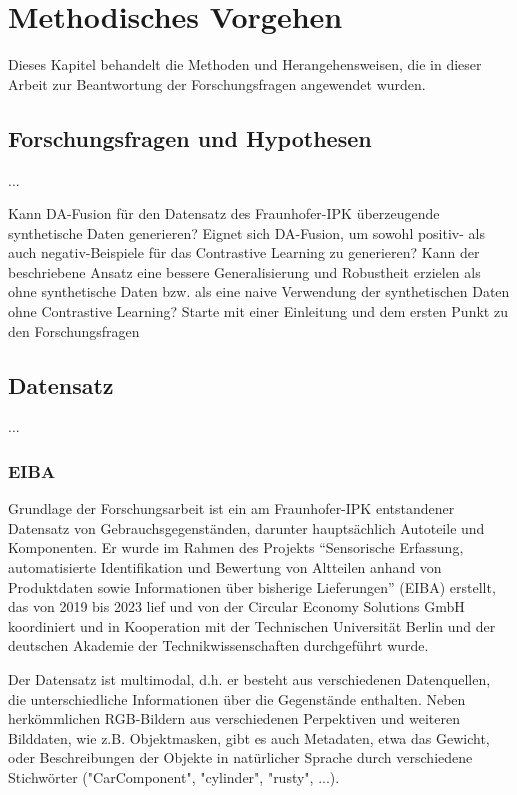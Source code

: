 \chapter{Methodisches Vorgehen}

Dieses Kapitel behandelt die Methoden und Herangehensweisen, die in dieser Arbeit zur Beantwortung der Forschungsfragen angewendet wurden.

\section{Forschungsfragen und Hypothesen}

...

\textbullet Kann DA-Fusion für den Datensatz des Fraunhofer-IPK überzeugende synthetische Daten generieren?
\textbullet Eignet sich DA-Fusion, um sowohl positiv- als auch negativ-Beispiele für das Contrastive Learning zu generieren?
\textbullet Kann der beschriebene Ansatz eine bessere Generalisierung und Robustheit erzielen als ohne synthetische Daten bzw. als eine naive Verwendung der synthetischen Daten ohne Contrastive Learning?
Starte mit einer Einleitung und dem ersten Punkt zu den Forschungsfragen

\section{Datensatz}

...

\subsection{EIBA}

Grundlage der Forschungsarbeit ist ein am Fraunhofer-IPK entstandener Datensatz von Gebrauchsgegenständen, darunter hauptsächlich Autoteile und Komponenten. Er wurde im Rahmen des Projekts “Sensorische Erfassung, automatisierte Identifikation und Bewertung von Altteilen anhand von Produktdaten sowie Informationen über bisherige Lieferungen” (EIBA) erstellt, das von 2019 bis 2023 lief und von der Circular Economy Solutions GmbH koordiniert und in Kooperation mit der Technischen Universität Berlin und der deutschen Akademie der Technikwissenschaften durchgeführt wurde.

Der Datensatz ist multimodal, d.h. er besteht aus verschiedenen Datenquellen, die unterschiedliche Informationen über die Gegenstände enthalten. Neben herkömmlichen RGB-Bildern aus verschiedenen Perpektiven und weiteren Bilddaten, wie z.B. Objektmasken, gibt es auch Metadaten, etwa das Gewicht, oder Beschreibungen der Objekte in natürlicher Sprache durch verschiedene Stichwörter ("CarComponent", "cylinder", "rusty", ...).

